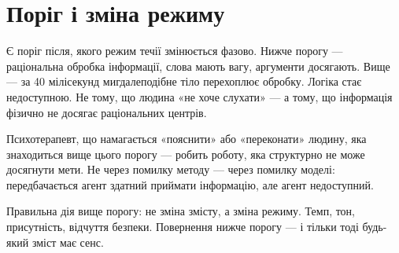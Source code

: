 \documentclass[12pt, a4paper, openany]{book}
\begin{document}
\section{Поріг і зміна режиму}

Є поріг після, якого режим течії змінюється фазово. Нижче порогу --- раціональна обробка інформації, слова мають вагу, аргументи досягають. Вище --- за 40 мілісекунд мигдалеподібне тіло перехоплює обробку. Логіка стає недоступною. Не тому, що людина «не хоче слухати» --- а тому, що інформація фізично не досягає раціональних центрів.

Психотерапевт, що намагається «пояснити» або «переконати» людину, яка знаходиться вище цього порогу --- робить роботу, яка структурно не може досягнути мети. Не через помилку методу --- через помилку моделі: передбачається агент здатний приймати інформацію, але агент недоступний.

Правильна дія вище порогу: не зміна змісту, а зміна режиму. Темп, тон, присутність, відчуття безпеки. Повернення нижче порогу --- і тільки тоді будь-який зміст має сенс.
\end{document}
